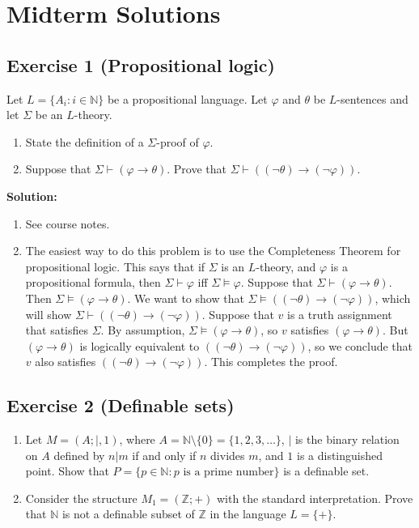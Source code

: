 \documentclass[10pt]{article}
\begin{document}
\section*{Midterm Solutions}
\subsection*{Exercise 1 (Propositional logic)}
Let $L = \{A_i : i \in \mathbb{N}\}$ be a propositional language. Let $\varphi$ and $\theta$ be $L$-sentences and let $\Sigma$ be an $L$-theory.

\begin{enumerate}[label=(\arabic*)]
    \item State the definition of a $\Sigma$-proof of $\varphi$.
    \item Suppose that $\Sigma \vdash (\varphi \rightarrow \theta)$. Prove that $\Sigma \vdash ((\neg \theta) \rightarrow (\neg \varphi))$.
\end{enumerate}

\textbf{Solution:}
\begin{enumerate}[label=(\arabic*)]
    \item See course notes.
    \item The easiest way to do this problem is to use the Completeness Theorem for propositional logic. This says that if $\Sigma$ is an $L$-theory, and $\varphi$ is a propositional formula, then $\Sigma \vdash \varphi$ iff $\Sigma \models \varphi$. Suppose that $\Sigma \vdash (\varphi \rightarrow \theta)$. Then $\Sigma \models (\varphi \rightarrow \theta)$. We want to show that $\Sigma \models ((\neg \theta) \rightarrow (\neg \varphi))$, which will show $\Sigma \vdash ((\neg \theta) \rightarrow (\neg \varphi))$. Suppose that $v$ is a truth assignment that satisfies $\Sigma$. By assumption, $\Sigma \models (\varphi \rightarrow \theta)$, so $v$ satisfies $(\varphi \rightarrow \theta)$. But $(\varphi \rightarrow \theta)$ is logically equivalent to $((\neg \theta) \rightarrow (\neg \varphi))$, so we conclude that $v$ also satisfies $((\neg \theta) \rightarrow (\neg \varphi))$. This completes the proof.
\end{enumerate}

\subsection*{Exercise 2 (Definable sets)}
\begin{enumerate}[label=(\arabic*)]
    \item Let $M = (A; |, 1)$, where $A = \mathbb{N} \setminus \{0\} = \{1, 2, 3, \ldots \}$, $|$ is the binary relation on $A$ defined by $n|m$ if and only if $n$ divides $m$, and $1$ is a distinguished point. Show that $P = \{p \in \mathbb{N} : p \text{ is a prime number}\}$ is a definable set.
    \item Consider the structure $M_1 = (\mathbb{Z}; +)$ with the standard interpretation. Prove that $\mathbb{N}$ is not a definable subset of $\mathbb{Z}$ in the language $L = \{+\}$.
\end{enumerate}
\end{document}
